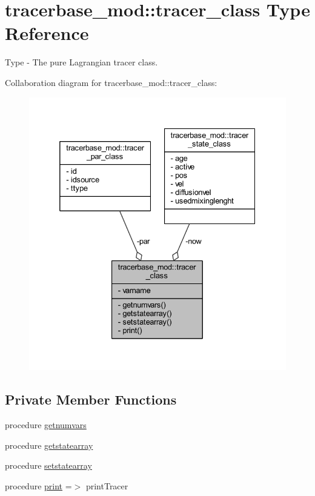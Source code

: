 \hypertarget{structtracerbase__mod_1_1tracer__class}{}\section{tracerbase\+\_\+mod\+:\+:tracer\+\_\+class Type Reference}
\label{structtracerbase__mod_1_1tracer__class}


Type -\/ The pure Lagrangian tracer class.  




Collaboration diagram for tracerbase\+\_\+mod\+:\+:tracer\+\_\+class\+:\nopagebreak
\begin{figure}[H]
\begin{center}
\leavevmode
\includegraphics[width=332pt]{structtracerbase__mod_1_1tracer__class__coll__graph}
\end{center}
\end{figure}
\subsection*{Private Member Functions}
\begin{DoxyCompactItemize}
\item 
procedure \mbox{\hyperlink{structtracerbase__mod_1_1tracer__class_a5458a1e53360bfcdf51c9a677caab112}{getnumvars}}
\item 
procedure \mbox{\hyperlink{structtracerbase__mod_1_1tracer__class_ada976e2f5180866e2d5999c087b38fdc}{getstatearray}}
\item 
procedure \mbox{\hyperlink{structtracerbase__mod_1_1tracer__class_ac8e61a82082c401bff8c726e0089a5e7}{setstatearray}}
\item 
procedure \mbox{\hyperlink{structtracerbase__mod_1_1tracer__class_a1142993acbb67b4fe43c52b554165e71}{print}} =$>$ print\+Tracer
\end{DoxyCompactItemize}
